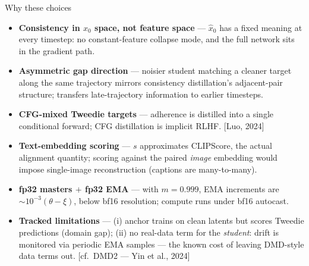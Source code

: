 \documentclass[aspectratio=169,10pt]{beamer}
\newcommand{\xhat}{\hat{x}_0}
\newcommand{\litref}[1]{{\scriptsize\color{black!55}[#1]}}
\begin{document}
\begin{frame}{Why these choices}
  \begin{itemize}
    \item \textbf{Consistency in $x_0$ space, not feature space} ---
      $\xhat$ has a fixed meaning at every timestep: no constant-feature
      collapse mode, and the full network sits in the gradient path.
    \item \textbf{Asymmetric gap direction} --- noisier student matching a
      cleaner target along the same trajectory mirrors consistency
      distillation's adjacent-pair structure; transfers late-trajectory
      information to earlier timesteps.
    \item \textbf{CFG-mixed Tweedie targets} --- adherence is distilled into a
      single conditional forward; CFG distillation is implicit RLHF.
      \litref{Luo, 2024}
    \item \textbf{Text-embedding scoring} --- $s$ approximates CLIPScore, the
      actual alignment quantity; scoring against the paired \emph{image}
      embedding would impose single-image reconstruction (captions are
      many-to-many).
    \item \textbf{fp32 masters $+$ fp32 EMA} --- with $m = 0.999$, EMA
      increments are ${\sim}10^{-3}(\theta - \xi)$, below bf16 resolution;
      compute runs under bf16 autocast.
    \item \textbf{Tracked limitations} --- (i) anchor trains on clean latents
      but scores Tweedie predictions (domain gap); (ii) no real-data term for
      the \emph{student}: drift is monitored via periodic EMA samples ---
      the known cost of leaving DMD-style data terms out.
      \litref{cf.\ DMD2 --- Yin et al., 2024}
  \end{itemize}
\end{frame}
\end{document}
